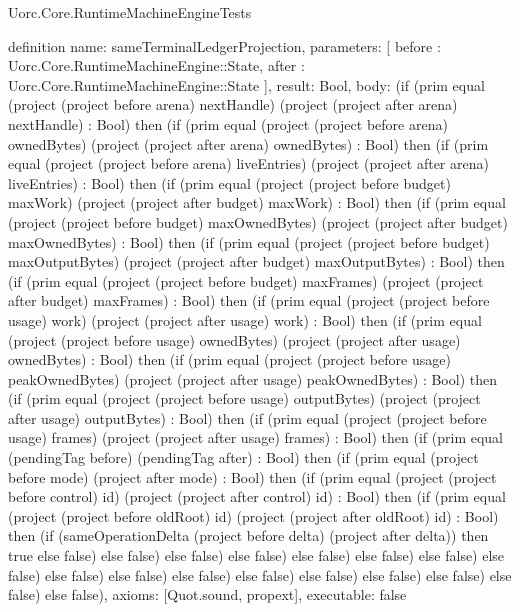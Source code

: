 \begin{lexlean}{Uorc.Core.RuntimeMachineEngineTests}
\begin{semanticmodule}
definition{
  name: sameTerminalLedgerProjection,
  parameters: [
    before : Uorc.Core.RuntimeMachineEngine::State,
    after : Uorc.Core.RuntimeMachineEngine::State
  ],
  result: Bool,
  body: (if (prim equal (project (project before arena) nextHandle) (project (project after arena) nextHandle) : Bool) then (if (prim equal (project (project before arena) ownedBytes) (project (project after arena) ownedBytes) : Bool) then (if (prim equal (project (project before arena) liveEntries) (project (project after arena) liveEntries) : Bool) then (if (prim equal (project (project before budget) maxWork) (project (project after budget) maxWork) : Bool) then (if (prim equal (project (project before budget) maxOwnedBytes) (project (project after budget) maxOwnedBytes) : Bool) then (if (prim equal (project (project before budget) maxOutputBytes) (project (project after budget) maxOutputBytes) : Bool) then (if (prim equal (project (project before budget) maxFrames) (project (project after budget) maxFrames) : Bool) then (if (prim equal (project (project before usage) work) (project (project after usage) work) : Bool) then (if (prim equal (project (project before usage) ownedBytes) (project (project after usage) ownedBytes) : Bool) then (if (prim equal (project (project before usage) peakOwnedBytes) (project (project after usage) peakOwnedBytes) : Bool) then (if (prim equal (project (project before usage) outputBytes) (project (project after usage) outputBytes) : Bool) then (if (prim equal (project (project before usage) frames) (project (project after usage) frames) : Bool) then (if (prim equal (pendingTag before) (pendingTag after) : Bool) then (if (prim equal (project before mode) (project after mode) : Bool) then (if (prim equal (project (project before control) id) (project (project after control) id) : Bool) then (if (prim equal (project (project before oldRoot) id) (project (project after oldRoot) id) : Bool) then (if (sameOperationDelta (project before delta) (project after delta)) then true else false) else false) else false) else false) else false) else false) else false) else false) else false) else false) else false) else false) else false) else false) else false) else false) else false),
  axioms: [Quot.sound, propext],
  executable: false
}


\end{semanticmodule}
\end{lexlean}
